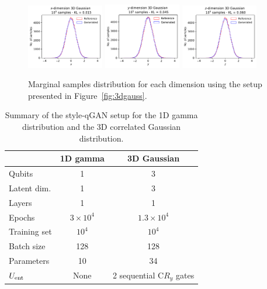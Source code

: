 \documentclass[twocolumn,preprintnumbers,superscriptaddress]{revtex4-2}
\begin{document}
\begin{figure}

  \includegraphics[width=0.3\textwidth]{plots/3Dgaussian_posdef/1-distribution_3dgaussian_100k.pdf}%
  \includegraphics[width=0.3\textwidth]{plots/3Dgaussian_posdef/2-distribution_3dgaussian_100k.pdf}%
  \includegraphics[width=0.3\textwidth]{plots/3Dgaussian_posdef/3-distribution_3dgaussian_100k.pdf}

  \caption{\label{fig:3dgauss_2}Marginal samples distribution for each dimension
  using the setup presented in Figure~\ref{fig:3dgauss}.}
\end{figure}

\begin{table}
  \begin{tabular}{l|c|c}
     & {\bf 1D gamma} & {\bf 3D Gaussian} \tabularnewline
    \hline
    Qubits & 1 & 3 \tabularnewline
    Latent dim. & 1 & 3 \tabularnewline
    Layers & 1 & 1 \tabularnewline
    Epochs & $3\times10^4$ & $1.3\times10^4$ \tabularnewline
    Training set & $10^4$ & $10^4$ \tabularnewline
    Batch size & 128 & 128 \tabularnewline
    Parameters & 10 & 34 \tabularnewline
    $U_{\rm ent}$ & None & 2 sequential C$R_y$ gates \tabularnewline
    \hline
  \end{tabular}

  \caption{\label{table:summary} Summary of the style-qGAN setup for the 1D
  gamma distribution and the 3D correlated Gaussian distribution.}
\end{table}
\end{document}
